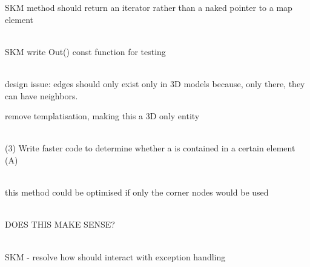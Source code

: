 \begin{DoxyRefList}
\label{todo__todo000122}%
%
SKM method should return an iterator rather than a naked pointer to a map element 
\item[Member \doxylink{classcsmp_1_1_eclipse_interface_aa21c38ffc68fc115f696d9fa9f50b132}{csmp\+::Eclipse\+Interface\+::Read\+\_\+\+COORD} (std\+::ifstream \&ifs, char \texorpdfstring{$\ast$}{*}text\+\_\+line, size\+\_\+t line\+\_\+length)]\hfill \\
\label{todo__todo000118}%
%
SKM write Out() const function for  testing  
\item[Class \doxylink{classcsmp_1_1_edge}{csmp\+::Edge\texorpdfstring{$<$}{<} dim \texorpdfstring{$>$}{>}} ]\hfill \\
\label{todo__todo000071}%
%
design issue\+: edges should only exist only in 3D models because, only there, they can have  neighbors. 



remove templatisation, making this a 3D only entity  
\item[Class \doxylink{classcsmp_1_1_element}{csmp\+::Element\texorpdfstring{$<$}{<} dim \texorpdfstring{$>$}{>}} ]\hfill \\
\label{todo__todo000002}%
%
(3) Write faster code to determine whether a  is contained in a certain element (A) 
\item[Member \doxylink{classcsmp_1_1_element_a72c8f8760ffd33d3a0cb5eee69e92c70}{csmp\+::Element\texorpdfstring{$<$}{<} dim \texorpdfstring{$>$}{>}\+::Length\+In\+Direction} (const \doxylink{classcsmp_1_1_vector_variable}{Vector\+Variable$<$ dim $>$} \&vec\+Direction) const]\hfill \\
\label{todo__todo000145}%
%
this method could be optimised if only the corner nodes would be used 
\item[Member \doxylink{classcsmp_1_1_e_o_s___c_o2_h2_o_na_cl___spycher04_a4d69520deb96194b6b144f1eb0536447}{csmp\+::EOS\+\_\+\+CO2\+H2\+ONa\+Cl\+\_\+\+Spycher04\+::Y\+\_\+\+Co2} (double pressure, double temperature, double msalt)]\hfill \\
\label{todo__todo000065}%
%
DOES THIS MAKE SENSE?  
\item[Class \doxylink{classcsmp_1_1_error_handler}{csmp\+::Error\+Handler} ]\hfill \\
\label{todo__todo000003}%
%
SKM -\/ resolve how  should interact with exception handling


\end{DoxyRefList}
